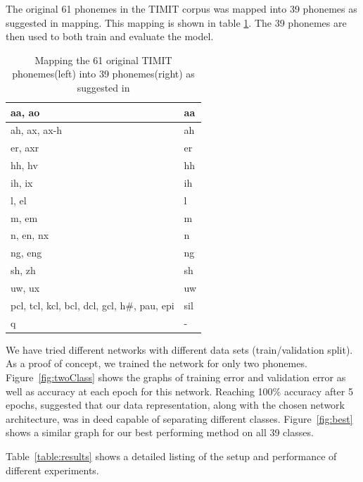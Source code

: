 The original 61 phonemes in the TIMIT corpus was mapped into 39 phonemes as suggested in {mapping}. This mapping is shown in table \ref{table:mapping}. The 39 phonemes are then used to both train and evaluate the model. 

\begin{table}[H]
\centering
    \begin{tabular}{ | l | l |}
    \hline
    aa, ao & aa \\ \hline
    ah, ax, ax-h  & ah \\ \hline
    er, axr & er \\ \hline
    hh, hv & hh \\ \hline   
    ih, ix & ih \\ \hline
	l, el & l \\ \hline
	m, em & m \\ \hline
	n, en, nx & n \\ \hline
	ng, eng & ng \\ \hline
	sh, zh & sh \\ \hline
	uw, ux & uw \\ \hline
	pcl, tcl, kcl, bcl, dcl, gcl, h\#, pau, epi & sil \\ \hline
	q & - \\ \hline
    \end{tabular}
    \caption{Mapping the 61 original TIMIT phonemes(left) into 39 phonemes(right) as suggested in \cite{mapping}}
    \label{table:mapping}
\end{table}


We have tried different networks with different data sets (train/validation split). As a proof of concept, we trained the network for only two phonemes. Figure~\ref{fig:twoClass} shows the graphs of training error and validation error as well as accuracy at each epoch for this network. Reaching 100\% accuracy after 5 epochs, suggested that our data representation, along with the chosen network architecture, was in deed capable of separating different classes. Figure~\ref{fig:best} shows a similar graph for our best performing method on all 39 classes.

Table~\ref{table:results} shows a detailed listing of the setup and performance of different experiments.

